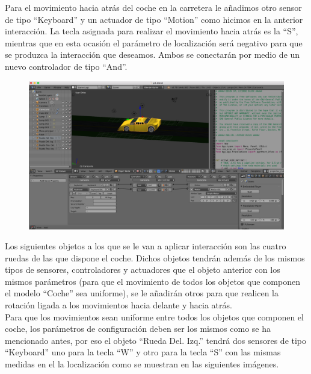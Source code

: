 \documentclass[10pt]{article}
\begin{document}
Para el movimiento hacia atrás del coche en la carretera le añadimos otro sensor de tipo ``Keyboard'' y un actuador de tipo ``Motion'' como hicimos en la anterior interacción. La tecla asignada  para realizar el movimiento hacia atrás es la ``S'', mientras que en esta ocasión el parámetro de localización será negativo para que se produzca la interacción que deseamos. Ambos se conectarán por medio de un nuevo controlador de tipo ``And''.\\

\begin{figure}[H]
	\begin{center}
	 		\includegraphics[width = 1.00\textwidth]{Imagenes/p4-img4}
	\end{center} 
\end{figure}

Los siguientes objetos a los que se le van a aplicar interacción son las cuatro ruedas de las que dispone el coche. Dichos objetos tendrán además de los mismos tipos de sensores, controladores y actuadores que el objeto anterior con los mismos parámetros (para que el movimiento de todos los objetos que componen el modelo ``Coche'' sea uniforme), se le añadirán otros para que realicen la rotación ligada a los movimientos hacia delante y hacia atrás.\\

Para que los movimientos sean uniforme entre todos los objetos que componen el coche, los parámetros de configuración deben ser los mismos como se ha mencionado antes, por eso el objeto ``Rueda Del. Izq.'' tendrá dos sensores de tipo ``Keyboard'' uno para la tecla ``W'' y otro para la tecla ``S'' con las mismas medidas en el la localización como se muestran en las siguientes imágenes. \\
\end{document}
